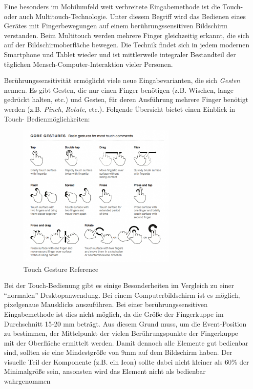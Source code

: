 Eine besonders im Mobilumfeld weit verbreitete Eingabemethode ist die Touch- oder auch Multitouch-Technologie. Unter diesem Begriff wird das Bedienen eines Gerätes mit Fingerbewegungen auf einem berührungssensitiven Bildschirm verstanden. Beim Multitouch werden mehrere Finger gleichzeitig erkannt, die sich auf der Bildschirmoberfläche bewegen. Die Technik findet sich in jedem modernen Smartphone und Tablet wieder und ist mittlerweile integraler Bestandteil der täglichen Mensch-Computer-Interaktion vieler Personen.\par
Berührungssensitivität ermöglicht viele neue Eingabevarianten, die sich \textit{Gesten} nennen. Es gibt Gesten, die nur einen Finger benötigen (z.B. Wischen, lange gedrückt halten, etc.) und Gesten, für deren Ausführung mehrere Finger benötigt werden (z.B. \textit{Pinch}, \textit{Rotate}, etc.). Folgende Übersicht bietet einen Einblick in Touch- Bedienmöglichkeiten:
\begin{figure}[H]
 \centering
 \includegraphics[width=0.7\textwidth]{grafiken/touchgestures.png}
 \caption[Touch Gesture Reference]{Touch Gesture Reference \cite{touchgestures2010}}
 \label{fig:touchGestures}
\end{figure}
Bei der Touch-Bedienung gibt es einige Besonderheiten im Vergleich zu einer \enquote{normalen} Desktopanwendung. Bei einem Computerbildschirm ist es möglich, pixelgenaue Mausklicks auszuführen. Bei einer berührungssensitiven Eingabemethode ist dies nicht möglich, da die Größe der Fingerkuppe im Durchschnitt 15-20 mm beträgt. Aus diesem Grund muss, um die Event-Position zu bestimmen, der Mittelpunkt der vielen Berührungspunkte der Fingerkuppe mit der Oberfläche ermittelt werden. Damit dennoch alle Elemente gut bedienbar sind, sollten sie eine Mindestgröße von 9mm auf dem Bildschirm haben. Der visuelle Teil der Komponente (z.B. ein Icon) sollte dabei nicht kleiner als 60\% der Minimalgröße sein, ansonsten wird das Element nicht als bedienbar wahrgenommen \cite[S. 136]{Moser2012}
